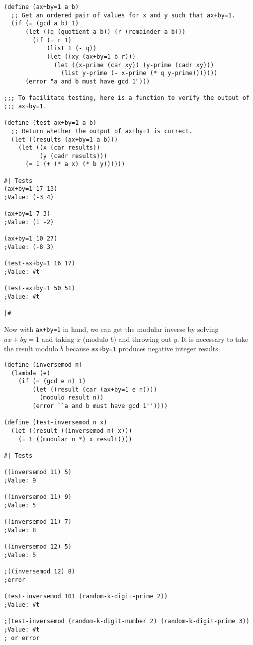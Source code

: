 \documentclass[12pt]{article}
\begin{document}
\begin{verbatim}
(define (ax+by=1 a b)
  ;; Get an ordered pair of values for x and y such that ax+by=1.
  (if (= (gcd a b) 1)
      (let ((q (quotient a b)) (r (remainder a b)))
        (if (= r 1)
            (list 1 (- q))
            (let ((xy (ax+by=1 b r)))
              (let ((x-prime (car xy)) (y-prime (cadr xy)))
                (list y-prime (- x-prime (* q y-prime)))))))
      (error "a and b must have gcd 1")))

;;; To facilitate testing, here is a function to verify the output of
;;; ax+by=1.

(define (test-ax+by=1 a b)
  ;; Return whether the output of ax+by=1 is correct.
  (let ((results (ax+by=1 a b)))
    (let ((x (car results))
          (y (cadr results)))
      (= 1 (+ (* a x) (* b y))))))

#| Tests
(ax+by=1 17 13)
;Value: (-3 4)

(ax+by=1 7 3)
;Value: (1 -2)

(ax+by=1 10 27)
;Value: (-8 3)

(test-ax+by=1 16 17)
;Value: #t

(test-ax+by=1 50 51)
;Value: #t

|#
\end{verbatim}

Now with \texttt{ax+by=1} in hand, we can get the modular inverse by
solving $ax+by=1$ and taking $x$ (modulo $b$) and throwing out
$y$. It is necessary to take the result modulo $b$ because
\texttt{ax+by=1} produces negative integer results.

\begin{verbatim}
(define (inversemod n)
  (lambda (e)
    (if (= (gcd e n) 1)
        (let ((result (car (ax+by=1 e n))))
          (modulo result n))
        (error ``a and b must have gcd 1''))))

(define (test-inversemod n x)
  (let ((result ((inversemod n) x)))
    (= 1 ((modular n *) x result))))

#| Tests

((inversemod 11) 5)
;Value: 9

((inversemod 11) 9)
;Value: 5

((inversemod 11) 7)
;Value: 8

((inversemod 12) 5)
;Value: 5

;((inversemod 12) 8)
;error

(test-inversemod 101 (random-k-digit-prime 2))
;Value: #t

;(test-inversemod (random-k-digit-number 2) (random-k-digit-prime 3))
;Value: #t
; or error
\end{verbatim}
\end{document}
